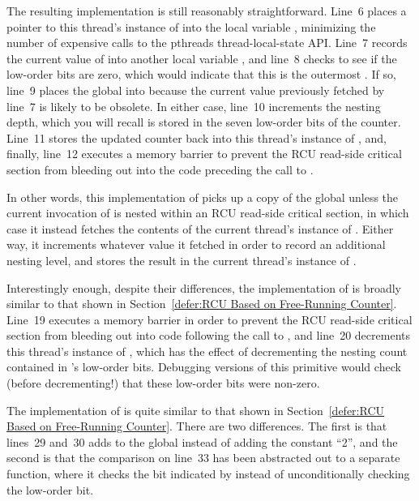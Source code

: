 The resulting  implementation is still reasonably
straightforward.
Line~6 places a pointer to this thread's instance of 
into the local variable , minimizing the number of expensive
calls to the pthreads thread-local-state API.
Line~7 records the current value of  into another
local variable , and line~8 checks to see if the low-order
bits are zero, which would indicate that this is the outermost
.
If so, line~9 places the global  into  because
the current value previously fetched by line~7 is likely to be obsolete.
In either case, line~10 increments the nesting depth, which you will
recall is stored in the seven low-order bits of the counter.
Line~11 stores the updated counter back into this thread's instance
of , and, finally, line~12 executes a memory
barrier to prevent the RCU read-side critical section from bleeding out
into the code preceding the call to .

In other words, this implementation of  picks up a copy
of the global  unless the current invocation of
 is nested within an RCU read-side critical section,
in which case it instead fetches the contents of the current thread's
instance of .
Either way, it increments whatever value it fetched in order to record
an additional nesting level, and stores the result in the current
thread's instance of .

Interestingly enough, despite their  differences,
the implementation of 
is broadly similar to that shown in
Section~\ref{defer:RCU Based on Free-Running Counter}.
Line~19 executes a memory barrier in order to prevent the RCU read-side
critical section from bleeding out into code following the call
to , and
line~20 decrements this thread's instance of ,
which has the effect of decrementing the nesting count contained in
's low-order bits.
Debugging versions of this primitive would check (before decrementing!)
that these low-order bits were non-zero.

The implementation of  is quite similar to
that shown in
Section~\ref{defer:RCU Based on Free-Running Counter}.
There are two differences.
The first is that lines~29 and~30 adds 
to the global  instead of adding the constant ``2'',
and the second is that the comparison on line~33 has been abstracted
out to a separate function, where it checks the bit indicated
by  instead of unconditionally checking
the low-order bit.

